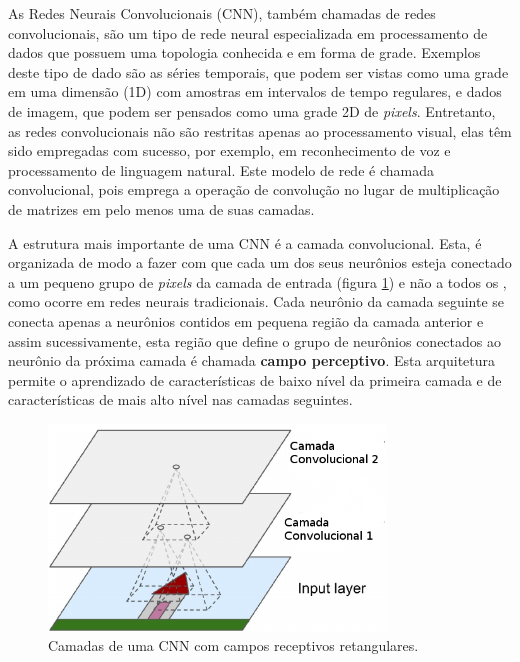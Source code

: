 As Redes Neurais Convolucionais (CNN), também chamadas de redes convolucionais,
são um tipo de rede neural especializada em processamento de dados que possuem uma
topologia conhecida e em forma de grade. Exemplos deste tipo de dado são as séries
temporais, que podem ser vistas como uma grade em uma dimensão (1D) com amostras
em intervalos de tempo regulares, e dados de imagem, que podem ser pensados como
uma grade 2D de \textit{pixels}. Entretanto, as redes convolucionais não são restritas
apenas ao processamento visual, elas têm sido empregadas com sucesso, por exemplo,
em reconhecimento de voz e processamento de linguagem natural.
Este modelo de rede é chamada convolucional, pois emprega a operação de convolução
no lugar de multiplicação de matrizes em pelo menos uma de suas camadas.

A estrutura mais importante de uma CNN é a camada convolucional. Esta, é organizada
de modo a fazer com que cada um dos seus neurônios esteja conectado a um 
pequeno grupo de \textit{pixels} da camada de entrada (figura \ref{fig:cnn_arq}) e não a todos os , como
ocorre em redes neurais tradicionais. Cada neurônio da camada seguinte se conecta apenas a neurônios
contidos em pequena região da camada anterior e assim sucessivamente, esta região que define
o grupo de neurônios conectados ao neurônio da próxima camada é chamada \textbf{campo perceptivo}. Esta arquitetura permite o
aprendizado de características de baixo nível da primeira camada e de características de mais alto nível
nas camadas seguintes.

\begin{figure}[htp]
\begin{center}
  \includegraphics[width=0.8\textwidth]{fig/cnn_arq}
  \caption{Camadas de uma CNN com campos receptivos retangulares.}
  \label{fig:cnn_arq}
\end{center}
\end{figure}

